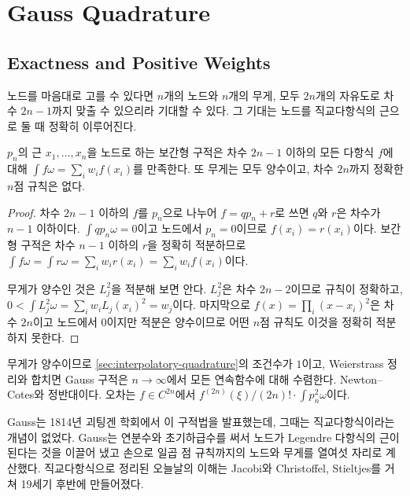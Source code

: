\section{Gauss Quadrature}
\label{sec:gauss}

\subsection{Exactness and Positive Weights}

노드를 마음대로 고를 수 있다면 $n$개의 노드와 $n$개의 무게, 모두 $2n$개의 자유도로 차수 $2n-1$까지 맞출 수 있으리라 기대할 수 있다. 그 기대는 노드를 직교다항식의 근으로 둘 때 정확히 이루어진다\cite{gautschi2004orthogonal}.

\begin{theorem}[Gauss]
\label{thm:gauss}
$p_n$의 근 $x_1,\dots,x_n$을 노드로 하는 보간형 구적은 차수 $2n-1$ 이하의 모든 다항식 $f$에 대해 $\int f\omega=\sum_iw_if(x_i)$를 만족한다. 또 무게는 모두 양수이고, 차수 $2n$까지 정확한 $n$점 규칙은 없다.
\end{theorem}

\begin{proof}
차수 $2n-1$ 이하의 $f$를 $p_n$으로 나누어 $f=qp_n+r$로 쓰면 $q$와 $r$은 차수가 $n-1$ 이하이다. $\int qp_n\omega=0$이고 노드에서 $p_n=0$이므로 $f(x_i)=r(x_i)$이다. 보간형 구적은 차수 $n-1$ 이하의 $r$을 정확히 적분하므로 $\int f\omega=\int r\omega=\sum_iw_ir(x_i)=\sum_iw_if(x_i)$이다.

무게가 양수인 것은 $L_j^2$을 적분해 보면 안다. $L_j^2$은 차수 $2n-2$이므로 규칙이 정확하고, $0<\int L_j^2\omega=\sum_iw_iL_j(x_i)^2=w_j$이다. 마지막으로 $f(x)=\prod_i(x-x_i)^2$은 차수 $2n$이고 노드에서 $0$이지만 적분은 양수이므로 어떤 $n$점 규칙도 이것을 정확히 적분하지 못한다.
\end{proof}

무게가 양수이므로 \cref{sec:interpolatory-quadrature}의 조건수가 $1$이고, Weierstrass 정리와 합치면 Gauss 구적은 $n\to\infty$에서 모든 연속함수에 대해 수렴한다. Newton--Cotes와 정반대이다. 오차는 $f\in C^{2n}$에서 $f^{(2n)}(\xi)/(2n)!\cdot\int p_n^2\omega$이다.

\begin{aside}[Gauss의 구적]
Gauss는 1814년 괴팅겐 학회에서 이 구적법을 발표했는데, 그때는 직교다항식이라는 개념이 없었다. Gauss는 연분수와 초기하급수를 써서 노드가 Legendre 다항식의 근이 된다는 것을 이끌어 냈고 손으로 일곱 점 규칙까지의 노드와 무게를 열여섯 자리로 계산했다. 직교다항식으로 정리된 오늘날의 이해는 Jacobi와 Christoffel, Stieltjes를 거쳐 19세기 후반에 만들어졌다.
\end{aside}

